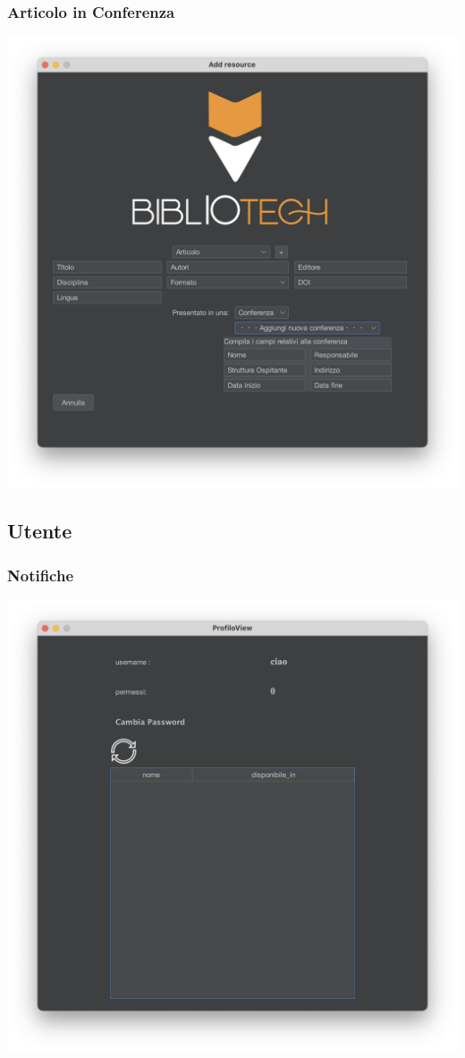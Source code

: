  \subsubsection{Articolo in Conferenza}
 \includegraphics[scale=0.25, center]{Immagini/Schermate/Insert/InserisciRisorsaPage-ArticoliConferenza.png}

 \subsection{Utente}
 \subsubsection{Notifiche}
 \includegraphics[scale=0.25, center]{Immagini/Schermate/Utente/NotificheUtente.png}
